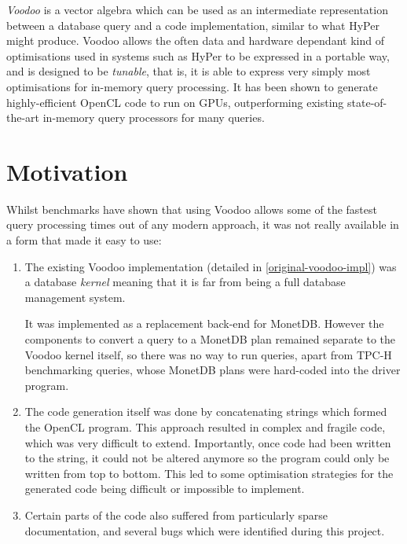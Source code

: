 \emph{Voodoo} \cite{Pirk:2016:VVA:3007328.3007336} is a vector algebra which can be used as an intermediate representation between a database query and a code implementation, similar to what HyPer might produce. Voodoo allows the often data and hardware dependant kind of optimisations used in systems such as HyPer to be expressed in a portable way, and is designed to be \emph{tunable}, that is, it is able to express very simply most optimisations for in-memory query processing. It has been shown to generate highly-efficient OpenCL code to run on GPUs, outperforming existing state-of-the-art in-memory query processors for many queries.

\section{Motivation}


Whilst benchmarks have shown that using Voodoo allows some of the fastest query processing times out of any modern approach, it was not really available in a form that made it easy to use:

\begin{enumerate}
    \item The existing Voodoo implementation (detailed in \ref{original-voodoo-impl}) was a database \emph{kernel} meaning that it is far from being a full database management system.
    
    It was implemented as a replacement back-end for MonetDB. However the components to convert a query to a MonetDB plan remained separate to the Voodoo kernel itself, so there was no way to run queries, apart from TPC-H benchmarking queries, whose MonetDB plans were hard-coded into the driver program.
    
    \item The code generation itself was done by concatenating strings which formed the OpenCL program. This approach resulted in complex and fragile code, which was very difficult to extend. Importantly, once code had been written to the string, it could not be altered anymore so the program could only be written from top to bottom. This led to some optimisation strategies for the generated code being difficult or impossible to implement. 
    \item Certain parts of the code also suffered from particularly sparse documentation, and several bugs which were identified during this project.
\end{enumerate}

